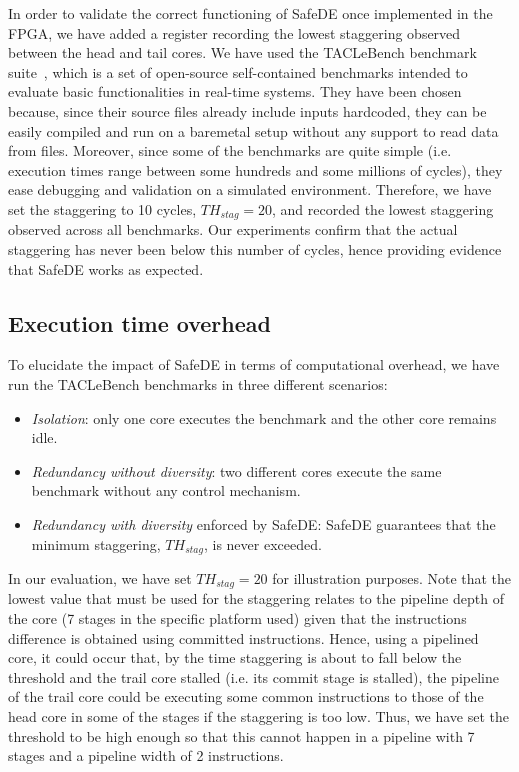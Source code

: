 In order to validate the correct functioning of SafeDE once implemented in the FPGA, we have added a register recording the lowest staggering observed between the head and tail cores. We have used the TACLeBench benchmark suite~\cite{taclebench}, which is a set of open-source self-contained benchmarks intended to evaluate basic functionalities in real-time systems. They have been chosen because, since their source files already include inputs hardcoded, they can be easily compiled and run on a baremetal setup without any support to read data from files. Moreover, since some of the benchmarks are quite simple (i.e. execution times range between some hundreds and some millions of cycles), they ease debugging and validation on a simulated environment.
Therefore, we have set the staggering to 10 cycles, $TH_{stag} = 20$, and recorded the lowest staggering observed across all benchmarks. Our experiments confirm that the actual staggering has never been below this number of cycles, hence providing evidence that SafeDE works as expected.


\subsection{Execution time overhead}


To elucidate the impact of SafeDE in terms of computational overhead, we have run the TACLeBench benchmarks in three different scenarios:
\begin{itemize}
\item \emph{Isolation}: only one core executes the benchmark and the other core remains idle. 
\item \emph{Redundancy without diversity}: two different cores execute the same benchmark without any control mechanism. 
\item \emph{Redundancy with diversity} enforced by SafeDE: SafeDE guarantees that the minimum staggering, $TH_{stag}$, is never exceeded. 
\end{itemize}

In our evaluation, we have set $TH_{stag} = 20$ for illustration purposes. Note that the lowest value that must be used for the staggering relates to the pipeline depth of the core (7 stages in the specific platform used) given that the instructions difference is obtained using committed instructions. Hence, using a pipelined core, it could occur that, by the time staggering is about to fall below the threshold and the trail core stalled (i.e. its commit stage is stalled), the pipeline of the trail core could be executing some common instructions to those of the head core in some of the stages if the staggering is too low. Thus, we have set the threshold to be high enough so that this cannot happen in a pipeline with 7 stages and a pipeline width of 2 instructions.

